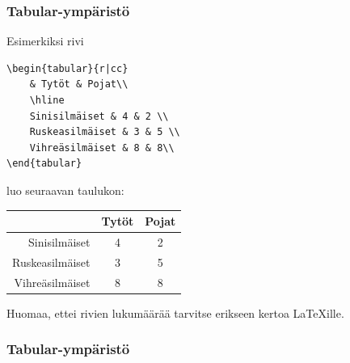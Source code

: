 \begin{frame}[fragile]
    \frametitle{Tabular-ympäristö}
    Esimerkiksi rivi
    \begin{scriptsize}
        \begin{Verbatim}[frame=single]
\begin{tabular}{r|cc}
    & Tytöt & Pojat\\
    \hline
    Sinisilmäiset & 4 & 2 \\
    Ruskeasilmäiset & 3 & 5 \\
    Vihreäsilmäiset & 8 & 8\\
\end{tabular}
        \end{Verbatim}
    \end{scriptsize}
    luo seuraavan taulukon:
    \begin{sample} 
        \begin{tabular}{r|cc}
            & Tytöt & Pojat\\
            \hline
            Sinisilmäiset & 4 & 2 \\
            Ruskeasilmäiset & 3 & 5 \\
            Vihreäsilmäiset & 8 & 8\\
        \end{tabular}
    \end{sample}
    Huomaa, ettei rivien lukumäärää tarvitse erikseen kertoa \LaTeX ille.

\end{frame}



\begin{frame}[fragile]
    \frametitle{Tabular-ympäristö}
    
    
\end{frame}
